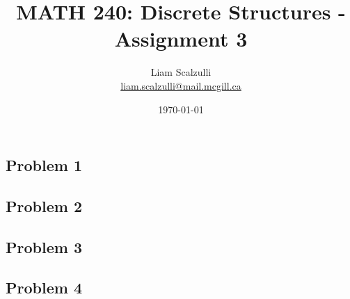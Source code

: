 \documentclass[10pt]{article}
\title{MATH 240: Discrete Structures - Assignment 3}
\author{Liam Scalzulli\\
\href{mailto:liam.scalzulli@mail.mcgill.ca}{liam.scalzulli@mail.mcgill.ca}}
\date{\today}
\begin{document}
\maketitle

\subsection*{Problem 1}

\newpage
\subsection*{Problem 2}

\newpage
\subsection*{Problem 3}

\newpage
\subsection*{Problem 4}
\end{document}
